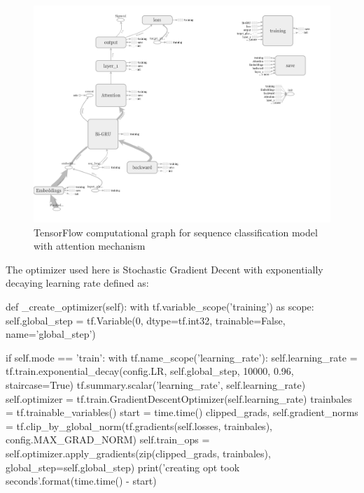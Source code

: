 \documentclass{article}
\begin{document}
    \begin{figure}
        \centering
        \includegraphics[scale=0.3]{tensorflow.png}
        \caption{TensorFlow computational graph for sequence classification model with attention mechanism}
        \label{fig:tensorflow}
    \end{figure}


    The optimizer used here is Stochastic Gradient Decent with exponentially decaying learning rate defined as:

    \begin{python}
    def _create_optimizer(self):
    with tf.variable_scope('training') as scope:
        self.global_step = tf.Variable(0, dtype=tf.int32, trainable=False,
                                        name='global_step')

        if self.mode == 'train':
            with tf.name_scope('learning_rate'):
                self.learning_rate = tf.train.exponential_decay(config.LR, self.global_step,
                                        10000, 0.96, staircase=True)
                tf.summary.scalar('learning_rate', self.learning_rate)
            self.optimizer = tf.train.GradientDescentOptimizer(self.learning_rate)
            trainbales = tf.trainable_variables()
            start = time.time()
            clipped_grads, self.gradient_norms = tf.clip_by_global_norm(tf.gradients(self.losses,
            trainbales), config.MAX_GRAD_NORM)
            self.train_ops = self.optimizer.apply_gradients(zip(clipped_grads, trainbales),
            global_step=self.global_step)
            print('creating opt took {} seconds'.format(time.time() - start)
    \end{python}
\end{document}
